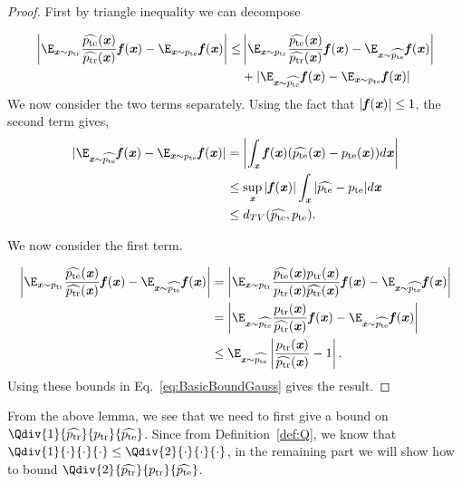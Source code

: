\begin{proof}
First by triangle inequality we can decompose

\begin{align}\label{eq:BasicBoundGauss}
    \left|\E_{\xx\sim \ptr} \frac{\widehat{\pte}(\xx)}{\widehat{\ptr}(\xx)} \ff(\xx) - \E_{\xx \sim \pte} \ff(\xx)\right| 
    \leq &  \left|\E_{\xx\sim \ptr} \frac{\widehat{\pte}(\xx)}{\widehat{\ptr}(\xx)} \ff(\xx) - \E_{\xx \sim \widehat{\pte}} \ff(\xx)\right| \notag \\
    & + |\E_{\xx \sim \widehat{\pte}} \ff(\xx) - \E_{\xx \sim {\pte}} \ff(\xx)|
\end{align}
We now consider the two terms separately. Using the fact that $|\boldsymbol{\mathit{f}}(\boldsymbol{\mathit{x}})|\leq 1$, the second term gives,
\begin{align*}
|\E_{\xx \sim \widehat{\pte}} \ff(\xx) - \E_{\xx \sim {\pte}} \ff(\xx)| &= \left|\int_{\xx} \ff(\xx) (\widehat{\pte}(\xx) -\pte(\xx)) d\xx \right|\\
& \leq \sup_{\xx}|\ff(\xx)| \int_{\xx} |\widehat{\pte} -\pte| d\xx\\
& \leq d_{TV}(\widehat{\pte},\pte).
\end{align*}

We now consider the first term.

\begin{align*}
           \left|\E_{\xx\sim \ptr} \frac{\widehat{\pte}(\xx)}{\widehat{\ptr}(\xx)} \ff(\xx) - \E_{\xx \sim \widehat{\pte}} \ff(\xx)\right| & = \left|\E_{\xx\sim \ptr} \frac{\widehat{\pte}(\xx)\ptr(\xx)}{\ptr(\xx)\widehat{\ptr}(\xx)} \ff(\xx) - \E_{\xx \sim \widehat{\pte}} \ff(\xx)\right| \\
            &  = \left|\E_{\xx\sim \widehat{\pte}} \frac{\ptr(\xx)}{\widehat{\ptr}(\xx)} \ff(\xx) - \E_{\xx \sim \widehat{\pte}} \ff(\xx)\right| \\
            &  \leq \E_{\xx\sim \widehat{\pte}} \left|\frac{\ptr(\xx)}{\widehat{\ptr}(\xx)} - 1 \right|.
    \end{align*}
    Using these bounds in Eq.~\eqref{eq:BasicBoundGauss} gives the result.

\end{proof}

From the above lemma, we see that we need to first give a bound on $\Qdiv{1}{\widehat{\ptr}}{\ptr}{\widehat{\pte}}$. Since from Definition~\ref{def:Q}, we know that $\Qdiv{1}{\cdot}{\cdot}{\cdot}\leq \Qdiv{2}{\cdot}{\cdot}{\cdot}$, in the remaining part we will show how to bound $\Qdiv{2}{\widehat{\ptr}}{\ptr}{\widehat{\pte}}$.




